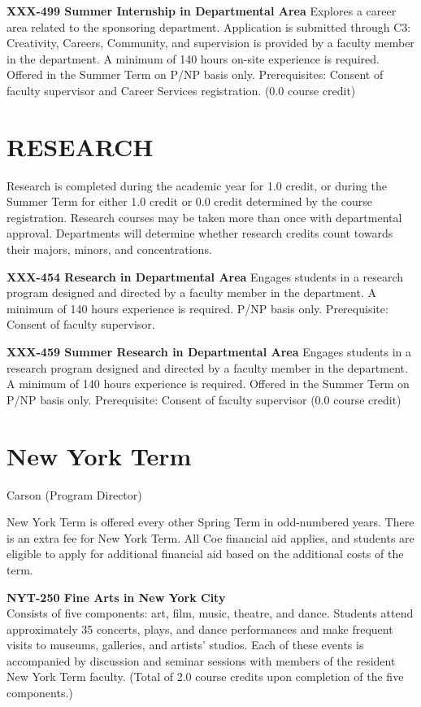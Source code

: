 \documentclass[
  letterpaper,
]{scrbook}
\begin{document}
\textbf{XXX-499 Summer Internship in Departmental Area} Explores a
career area related to the sponsoring department. Application is
submitted through C3: Creativity, Careers, Community, and supervision is
provided by a faculty member in the department. A minimum of 140 hours
on-site experience is required. Offered in the Summer Term on P/NP basis
only. Prerequisites: Consent of faculty supervisor and Career Services
registration. (0.0 course credit)

\section{RESEARCH}\label{research}

Research is completed during the academic year for 1.0 credit, or during
the Summer Term for either 1.0 credit or 0.0 credit determined by the
course registration. Research courses may be taken more than once with
departmental approval. Departments will determine whether research
credits count towards their majors, minors, and concentrations.

\textbf{XXX-454 Research in Departmental Area} Engages students in a
research program designed and directed by a faculty member in the
department. A minimum of 140 hours experience is required. P/NP basis
only. Prerequisite: Consent of faculty supervisor.

\textbf{XXX-459 Summer Research in Departmental Area} Engages students
in a research program designed and directed by a faculty member in the
department. A minimum of 140 hours experience is required. Offered in
the Summer Term on P/NP basis only. Prerequisite: Consent of faculty
supervisor (0.0 course credit)

\section{New York Term}\label{new-york-term-1}

Carson (Program Director)

New York Term is offered every other Spring Term in odd-numbered years.
There is an extra fee for New York Term. All Coe financial aid applies,
and students are eligible to apply for additional financial aid based on
the additional costs of the term.

\textbf{NYT-250 Fine Arts in New York City}\\
Consists of five components: art, film, music, theatre, and dance.
Students attend approximately 35 concerts, plays, and dance performances
and make frequent visits to museums, galleries, and artists' studios.
Each of these events is accompanied by discussion and seminar sessions
with members of the resident New York Term faculty. (Total of 2.0 course
credits upon completion of the five components.)
\end{document}
